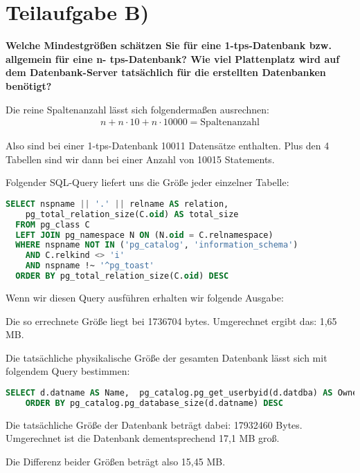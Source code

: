 \section{Teilaufgabe B)}
\textbf{Welche Mindestgrößen schätzen Sie für eine 1-tps-Datenbank bzw. allgemein für eine n-
tps-Datenbank? Wie viel Plattenplatz wird auf dem Datenbank-Server tatsächlich für die
erstellten Datenbanken benötigt?}

Die reine Spaltenanzahl lässt sich folgendermaßen ausrechnen:
\begin{eqnarray}
n + n \cdot 10 + n \cdot 10000 = \mbox{Spaltenanzahl}
\end{eqnarray}

Also sind bei einer 1-tps-Datenbank 10011 Datensätze enthalten. Plus den 4
Tabellen sind wir dann bei einer Anzahl von 10015 Statements.

Folgender SQL-Query liefert uns die Größe jeder einzelner Tabelle:
\begin{lstlisting}[language=sql, caption={Größe der Tabelle und Datensätze
ermitteln}]
  SELECT nspname || '.' || relname AS relation,
    pg_total_relation_size(C.oid) AS total_size
  FROM pg_class C
  LEFT JOIN pg_namespace N ON (N.oid = C.relnamespace)
  WHERE nspname NOT IN ('pg_catalog', 'information_schema')
    AND C.relkind <> 'i'
    AND nspname !~ '^pg_toast'
  ORDER BY pg_total_relation_size(C.oid) DESC
\end{lstlisting}

Wenn wir diesen Query ausführen erhalten wir folgende Ausgabe:

Die so errechnete Größe liegt bei 1736704 bytes. Umgerechnet ergibt das: 
1,65 MB.

Die tatsächliche physikalische Größe der gesamten Datenbank lässt sich mit
folgendem Query bestimmen:
\begin{lstlisting}[language=sql, caption={Physikalische Größe der Datenbank
ermitteln}]
SELECT d.datname AS Name,  pg_catalog.pg_get_userbyid(d.datdba) AS Owner, pg_catalog.pg_database_size(d.datname) AS SIZE FROM pg_catalog.pg_database d
    ORDER BY pg_catalog.pg_database_size(d.datname) DESC
\end{lstlisting}

Die tatsächliche Größe der Datenbank beträgt dabei: 17932460 Bytes. Umgerechnet
ist die Datenbank dementsprechend 17,1 MB groß.

Die Differenz beider Größen beträgt also 15,45 MB.
